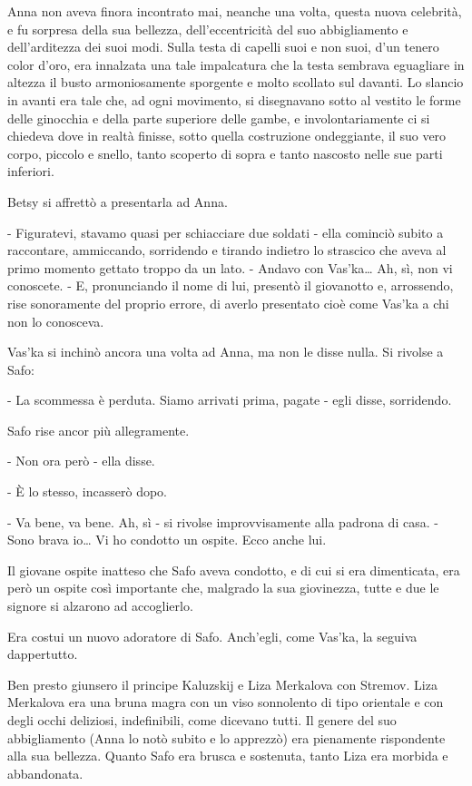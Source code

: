 Anna non aveva finora incontrato mai, neanche una volta, questa nuova celebrità, e fu sorpresa della sua bellezza, dell'eccentricità del suo abbigliamento e dell'arditezza dei suoi modi. Sulla testa di capelli suoi e non suoi, d'un tenero color d'oro, era innalzata una tale impalcatura che la testa sembrava eguagliare in altezza il busto armoniosamente sporgente e molto scollato sul davanti. Lo slancio in avanti era tale che, ad ogni movimento, si disegnavano sotto al vestito le forme delle ginocchia e della parte superiore delle gambe, e involontariamente ci si chiedeva dove in realtà finisse, sotto quella costruzione ondeggiante, il suo vero corpo, piccolo e snello, tanto scoperto di sopra e tanto nascosto nelle sue parti inferiori. 

Betsy si affrettò a presentarla ad Anna. 

- Figuratevi, stavamo quasi per schiacciare due soldati - ella cominciò subito a raccontare, ammiccando, sorridendo e tirando indietro lo strascico che aveva al primo momento gettato troppo da un lato. - Andavo con Vas'ka\ldots{} Ah, sì, non vi conoscete. - E, pronunciando il nome di lui, presentò il giovanotto e, arrossendo, rise sonoramente del proprio errore, di averlo presentato cioè come Vas'ka a chi non lo conosceva. 

Vas'ka si inchinò ancora una volta ad Anna, ma non le disse nulla. Si rivolse a Safo: 

- La scommessa è perduta. Siamo arrivati prima, pagate - egli disse, sorridendo. 

Safo rise ancor più allegramente. 

- Non ora però - ella disse. 

- È lo stesso, incasserò dopo. 

- Va bene, va bene. Ah, sì - si rivolse improvvisamente alla padrona di casa. - Sono brava io\ldots{} Vi ho condotto un ospite. Ecco anche lui. 

Il giovane ospite inatteso che Safo aveva condotto, e di cui si era dimenticata, era però un ospite così importante che, malgrado la sua giovinezza, tutte e due le signore si alzarono ad accoglierlo. 

Era costui un nuovo adoratore di Safo. Anch'egli, come Vas'ka, la seguiva dappertutto. 

Ben presto giunsero il principe Kaluzskij e Liza Merkalova con Stremov. Liza Merkalova era una bruna magra con un viso sonnolento di tipo orientale e con degli occhi deliziosi, indefinibili, come dicevano tutti. Il genere del suo abbigliamento (Anna lo notò subito e lo apprezzò) era pienamente rispondente alla sua bellezza. Quanto Safo era brusca e sostenuta, tanto Liza era morbida e abbandonata. 

